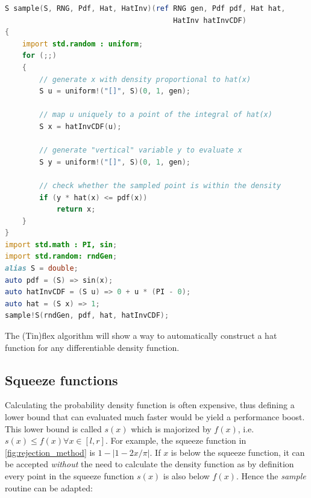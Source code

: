 \begin{minipage}{0.9\linewidth}
\begin{lstlisting}[language=D]
S sample(S, RNG, Pdf, Hat, HatInv)(ref RNG gen, Pdf pdf, Hat hat,
                                       HatInv hatInvCDF)
{
    import std.random : uniform;
    for (;;)
    {
        // generate x with density proportional to hat(x)
        S u = uniform!("[]", S)(0, 1, gen);

		// map u uniquely to a point of the integral of hat(x)
        S x = hatInvCDF(u);

        // generate "vertical" variable y to evaluate x
        S y = uniform!("[]", S)(0, 1, gen);

        // check whether the sampled point is within the density
        if (y * hat(x) <= pdf(x))
            return x;
    }
}
import std.math : PI, sin;
import std.random: rndGen;
alias S = double;
auto pdf = (S) => sin(x);
auto hatInvCDF = (S u) => 0 + u * (PI - 0);
auto hat = (S x) => 1;
sample!S(rndGen, pdf, hat, hatInvCDF);
\end{lstlisting}
\end{minipage}

The (Tin)flex algorithm will show a way to automatically construct a hat function for any differentiable density function.

\subsection{Squeeze functions}
\label{subsection:squeeze}

Calculating the probability density function is often expensive, thus defining a lower bound that can evaluated much faster would be yield a performance boost.
This lower bound is called $s(x)$ which is majorized by $f(x)$, i.e. $s(x) \leq f(x) \forall x \in [l, r]$.
For example, the squeeze function in \autoref{fig:rejection_method} is $1 - |1 - 2x / \pi |$. If $x$ is below the squeeze function, it can be accepted \textit{without} the need to calculate the density function as by definition every point in the squeeze function $s(x)$ is also below $f(x)$. Hence the \textit{sample} routine can be adapted:

